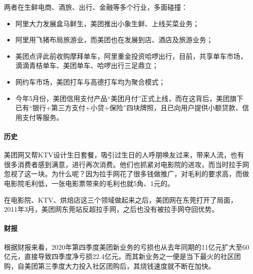 \documentclass[letterpaper,11pt,english]{sphinxmanual}
\begin{document}
两者在生鲜电商、酒旅、出行、金融等多个行业，多面碰撞：%
\begin{footnote}[907]\sphinxAtStartFootnote
{}
%
\end{footnote}
\begin{itemize}
\item {} 
阿里大力发展盒马鲜生，美团推出小象生鲜、上线买菜业务；

\item {} 
阿里用飞猪布局旅游业，而美团也在发展到店、酒店及旅游业务；

\item {} 
美团点评此前收购摩拜单车，阿里重金投资哈啰出行，目前，共享单车市场，滴滴青桔单车、美团单车、哈啰出行三足鼎立；

\item {} 
网约车市场，美团打车与高德打车均为聚合模式；

\item {} 
今年5月份，美团信用支付产品“美团月付”正式上线，而在这背后，美团旗下已有“银行+第三方支付+小贷+保险”四块牌照，且已向用户提供小额贷款、信用支付等服务。

\end{itemize}


\paragraph{历史}
\label{\detokenize{chapter_company/meituan:id4}}
美团网又帮KTV设计生日套餐，吸引过生日的人呼朋唤友过来，带来人流，也有很多消费者感到满意，进行再次消费。他们也抓紧对电影院的进攻，而当时拉手网忽视了这一块。为什么呢？因为拉手网花了很多钱做推广，对毛利的要求高，而做电影院毛利低，一张电影票带来的毛利也就5角、1元的。

在电影院、KTV、烘焙店这三个领域做起来之后，美团网在东莞打开了局面，2011年3月，美团网东莞站反超拉手网，之后也没有被拉手网夺回优势。


\paragraph{财报}
\label{\detokenize{chapter_company/meituan:id5}}
根据财报来看，2020年第四季度美团新业务的亏损也从去年同期的11亿元扩大至60亿元，直接导致四季度净亏损22.4亿元。而其新业务之一便是当下最火的社区团购，自美团第三季度大力投入社区团购后，其烧钱速度就不断在加快。%
\begin{footnote}[908]\sphinxAtStartFootnote
{}
%
\end{footnote}
\end{document}
